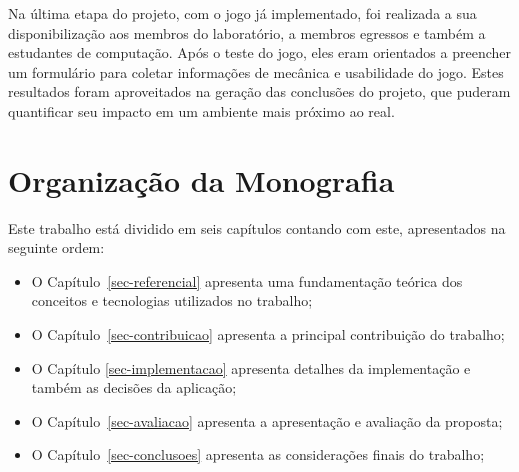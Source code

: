 Na última etapa do projeto, com o jogo já implementado, foi realizada a sua disponibilização aos membros do laboratório, a membros egressos e também a estudantes de computação. Após o teste do jogo, eles eram orientados a preencher um formulário para coletar informações de mecânica e usabilidade do jogo. Estes resultados foram aproveitados na geração das conclusões do projeto, que puderam quantificar seu impacto em um ambiente mais próximo ao real.




\section{Organização da Monografia}
\label{sec-intro-organizacao}

Este trabalho está dividido em seis capítulos contando com este, apresentados na seguinte ordem:


\begin{itemize}
	\item O Capítulo~\ref{sec-referencial} apresenta uma fundamentação teórica dos conceitos e tecnologias
 utilizados no trabalho;
	
	\item O Capítulo~\ref{sec-contribuicao} apresenta a principal contribuição do trabalho;

        \item O Capítulo \ref{sec-implementacao} apresenta detalhes da implementação e também as decisões da aplicação;
        
	\item O Capítulo~\ref{sec-avaliacao} apresenta a apresentação e avaliação da proposta;
	
	\item O Capítulo~\ref{sec-conclusoes} apresenta as considerações finais do trabalho;
	
\end{itemize}


